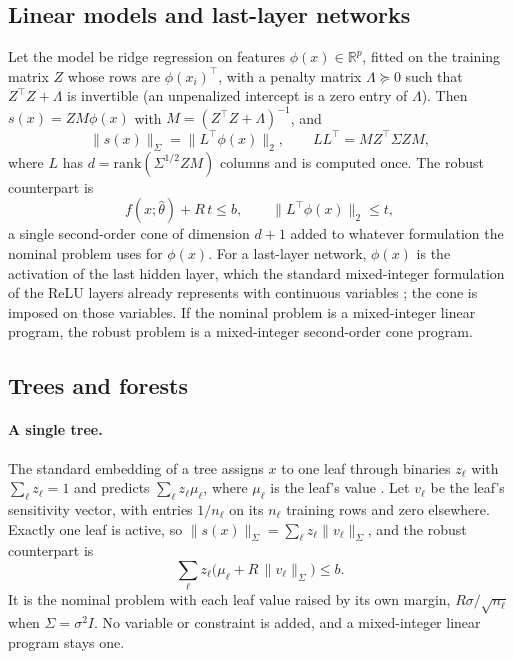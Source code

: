 \subsection{Linear models and last-layer networks}
Let the model be ridge regression on features $\phi(x) \in \mathbb{R}^p$,
fitted on the training matrix $Z$ whose rows are $\phi(x_i)^\top$, with a
penalty matrix $\Lambda \succeq 0$ such that $Z^\top Z + \Lambda$ is
invertible (an unpenalized intercept is a zero entry of $\Lambda$). Then
$s(x) = ZM\phi(x)$ with $M = (Z^\top Z + \Lambda)^{-1}$, and
\[
  \|s(x)\|_\Sigma = \|L^\top \phi(x)\|_2,
  \qquad LL^\top = MZ^\top\Sigma ZM ,
\]
where $L$ has $d = \mathrm{rank}(\Sigma^{1/2}ZM)$ columns and is computed once.
The robust counterpart is
\[
  f(x;\hat\theta) + R\,t \le b, \qquad \|L^\top \phi(x)\|_2 \le t ,
\]
a single second-order cone of dimension $d + 1$ added to whatever formulation
the nominal problem uses for $\phi(x)$. For a last-layer network, $\phi(x)$ is
the activation of the last hidden layer, which the standard mixed-integer
formulation of the ReLU layers already represents with continuous variables
\citep{maragno2025mixed}; the cone is imposed on those variables. If the
nominal problem is a mixed-integer linear program, the robust problem is a
mixed-integer second-order cone program.

\subsection{Trees and forests}
\paragraph{A single tree.}
The standard embedding of a tree assigns $x$ to one leaf through binaries
$z_\ell$ with $\sum_\ell z_\ell = 1$ and predicts $\sum_\ell z_\ell\mu_\ell$,
where $\mu_\ell$ is the leaf's value \citep{maragno2025mixed}. Let $v_\ell$ be
the leaf's sensitivity vector, with entries $1/n_\ell$ on its $n_\ell$ training
rows and zero elsewhere. Exactly one leaf is active, so
$\|s(x)\|_\Sigma = \sum_\ell z_\ell\|v_\ell\|_\Sigma$, and the robust
counterpart is
\[
  \sum_\ell z_\ell\bigl(\mu_\ell + R\,\|v_\ell\|_\Sigma\bigr) \le b .
\]
It is the nominal problem with each leaf value raised by its own margin,
$R\sigma/\sqrt{n_\ell}$ when $\Sigma = \sigma^2 I$. No variable or constraint
is added, and a mixed-integer linear program stays one.

